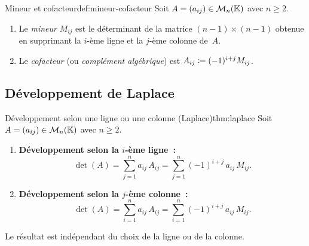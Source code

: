 \begin{definition}{Mineur et cofacteur}{def:mineur-cofacteur}
  Soit $A=(a_{ij})\in\mathcal{M}_n({\mathbb{K}})$ avec $n\geq 2$.
  \begin{enumerate}[label=(\roman*)]
    \item Le \emph{mineur} $M_{ij}$ est le déterminant de
      la matrice $(n-1)\times(n-1)$ obtenue en supprimant la $i$-ème
      ligne et la $j$-ème colonne de~$A$.
    \item Le \emph{cofacteur} (ou \emph{complément
      algébrique}) est $A_{ij}\coloneqq(-1)^{i+j}M_{ij}$.
  \end{enumerate}
\end{definition}

\subsection{Développement de Laplace}\label{subsec:laplace}

\begin{theorem}{Développement selon une ligne ou une colonne (Laplace)}{thm:laplace}
  Soit $A=(a_{ij})\in\mathcal{M}_n({\mathbb{K}})$ avec $n\geq 2$.
  \begin{enumerate}[label=(\roman*)]
    \item \textbf{Développement selon la $i$-ème ligne~:}
      \[
        \det(A)=\sum_{j=1}^{n}a_{ij}\,A_{ij}
        =\sum_{j=1}^{n}(-1)^{i+j}\,a_{ij}\,M_{ij}.
      \]
    \item \textbf{Développement selon la $j$-ème colonne~:}
      \[
        \det(A)=\sum_{i=1}^{n}a_{ij}\,A_{ij}
        =\sum_{i=1}^{n}(-1)^{i+j}\,a_{ij}\,M_{ij}.
      \]
  \end{enumerate}
  Le résultat est indépendant du choix de la ligne ou de la colonne.
\end{theorem}


